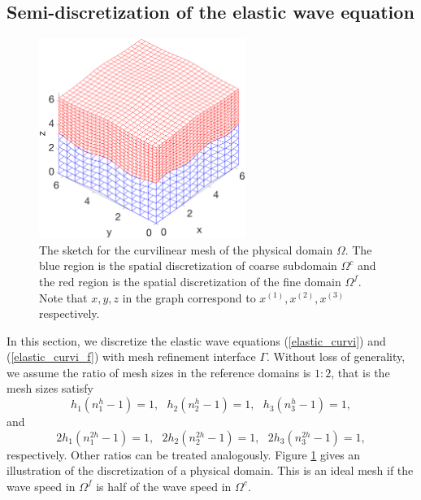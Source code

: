 \subsection{Semi-discretization of the elastic wave equation}\label{semi_discrete_form}

\begin{figure}[htbp]
	\centering
	\includegraphics[width=0.6\textwidth,trim={0.4cm 0.7cm 0.8cm 1.4cm}, clip]{physical_discretization.eps}
	\caption{The sketch for the curvilinear mesh of the physical domain $\Omega$. The blue region is the spatial discretization of coarse subdomain $\Omega^c$ and the red region is the spatial discretization of the fine domain $\Omega^f$. Note that $x,y,z$ in the graph correspond to $x^{(1)}, x^{(2)}, x^{(3)}$ respectively. 
	 }\label{physical_discretization}
\end{figure}

In this section, we discretize the elastic wave equations (\ref{elastic_curvi}) and  (\ref{elastic_curvi_f}) with mesh refinement interface $\Gamma$. Without loss of generality, we assume the ratio of mesh sizes in the reference domains is $1:2$, that is the mesh sizes satisfy
\[h_1(n_1^h-1) = 1, \ \ \ h_2(n_2^h-1) = 1, \ \ \ h_3(n_3^h-1) = 1,\]
and
\[2h_1(n_1^{2h}-1) = 1, \ \ \ 2h_2(n_2^{2h}-1) = 1, \ \ \ 2h_3(n_3^{2h}-1) = 1,\]
respectively. Other ratios can be treated analogously. Figure \ref{physical_discretization} gives an illustration of the discretization of a physical domain. This is an ideal mesh if the wave speed in $\Omega^f$ is half of the wave speed in $\Omega^c$.

